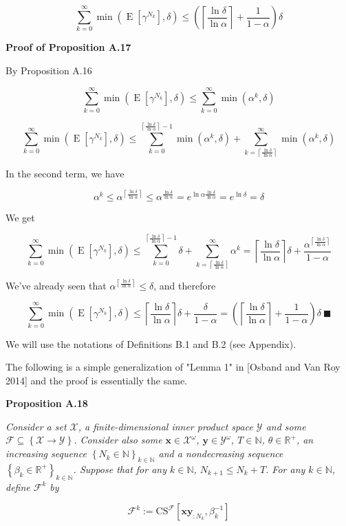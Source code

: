 \documentclass[a4paper]{article}
\newcommand{\Co}[1]{}
\newcommand{\San}[1]{}
\newcommand{\AP}[1]{\left(#1\right)}
\newcommand{\AB}[1]{\left[#1\right]}
\newcommand{\AC}[1]{\left\{#1\right\}}
\newcommand{\Ceil}[1]{\left\lceil #1 \right\rceil}
\newcommand{\E}[1]{\operatorname{E}\AB{#1}}
\newcommand{\Nats}{\mathbb{N}}
\newcommand{\Reals}{\mathbb{R}}
\newcommand{\X}{\mathcal{X}}
\newcommand{\Y}{\mathcal{Y}}
\newcommand{\F}{\mathcal{F}}
\newcommand{\CS}{\mathrm{CS}}
\begin{document}
$$\sum_{k=0}^\infty\min\AP{\E{\gamma^{N_k}},\delta}\leq\AP{\Ceil{\frac{\ln\delta}{\ln\alpha}}+\frac{1}{1-\alpha}}\delta$$

\textbf{Proof of Proposition A.17}\Co{b}

By Proposition A.16

$$\sum_{k=0}^\infty\min\AP{\E{\gamma^{N_k}},\delta}\leq\sum_{k=0}^\infty\min\AP{\alpha^k,\delta}$$

$$\sum_{k=0}^\infty\min\AP{\E{\gamma^{N_k}},\delta}\leq\sum_{k=0}^{\Ceil{\frac{\ln\delta}{\ln\alpha}}-1}\min\AP{\alpha^k,\delta}+\sum_{k=\Ceil{\frac{\ln\delta}{\ln\alpha}}}^\infty\min\AP{\alpha^k,\delta}$$

In the second term, we have

$$\alpha^k\leq\alpha^{\Ceil{\frac{\ln\delta}{\ln\alpha}}}\leq\alpha^{\frac{\ln\delta}{\ln\alpha}}=e^{\ln\alpha\frac{\ln\delta}{\ln\alpha}}=e^{\ln\delta}=\delta$$

We get

$$\sum_{k=0}^\infty\min\AP{\E{\gamma^{N_k}},\delta}\leq\sum_{k=0}^{\Ceil{\frac{\ln\delta}{\ln\alpha}}-1}\delta+\sum_{k=\Ceil{\frac{\ln\delta}{\ln\alpha}}}^\infty\alpha^k=\Ceil{\frac{\ln\delta}{\ln\alpha}}\delta+\frac{\alpha^{\Ceil{\frac{\ln\delta}{\ln\alpha}}}}{1-\alpha}$$

We've already seen that $\alpha^{\Ceil{\frac{\ln\delta}{\ln\alpha}}}\leq\delta$, and therefore

$$\sum_{k=0}^\infty\min\AP{\E{\gamma^{N_k}},\delta}\leq\Ceil{\frac{\ln\delta}{\ln\alpha}}\delta+\frac{\delta}{1-\alpha}=\AP{\Ceil{\frac{\ln\delta}{\ln\alpha}}+\frac{1}{1-\alpha}}\delta\ \blacksquare$$

We will use the notations of Definitions B.1 and B.2 (see Appendix).

The following is a simple generalization of "Lemma 1" in [Osband and Van Roy 2014]\San{(https://arxiv.org/abs/1406.1853)} and the proof is essentially the same.

\textbf{Proposition A.18}\Co{b}

\textit{Consider a set $\X$, a finite-dimensional inner product space $\Y$ and some $\F\subseteq\AC{\X\rightarrow\Y}$. Consider also some $\boldsymbol{x}\in\X^\omega$, $\boldsymbol{y}\in\Y^\omega$, $T\in\Nats$, $\theta\in\Reals^+$, an increasing sequence $\AC{N_k\in\Nats}_{k\in\Nats}$ and a nondecreasing sequence $\AC{\beta_k\in\Reals^+}_{k\in\Nats}$. Suppose that for any $k\in\Nats$, $N_{k+1}\leq N_k+T$. For any $k\in\Nats$, define $\F^k$ by}\Co{i}

$$\F^k:=\CS^\F\AB{\boldsymbol{xy}_{:N_k},\beta_k^{-1}}$$
\end{document}
